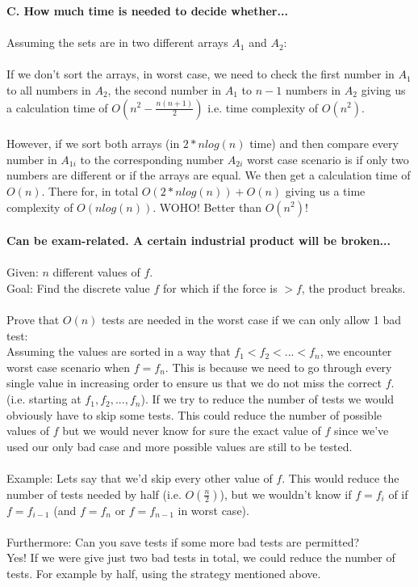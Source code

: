 \documentclass[12pt,oneside,reqno]{amsart}
\begin{document}
\textbf{C. How much time is needed to decide whether...}\\\\
Assuming the sets are in two different arrays $A_1$ and $A_2$:\\\\
If we don't sort the arrays, in worst case, we need to check the first number in $A_1$ to all numbers in $A_2$, the second number in $A_1$ to $n-1$ numbers in $A_2$ giving us a calculation time of $O(n^2-\frac{n(n+1)}{2})$ i.e. time complexity of $O(n^2)$.\\\\
However, if we sort both arrays (in $2*nlog(n)$ time) and then compare every number in $A_{1i}$ to the corresponding number $A_{2i}$ worst case scenario is if only two numbers are different or if the arrays are equal. We then get a calculation time of $O(n)$. There for, in total $O(2*nlog(n)) + O(n)$ giving us a time complexity of $O(nlog(n))$. WOHO! Better than $O(n^2)!$\\\\
\newpage
\textbf{Can be exam-related. A certain industrial product will be broken...}\\\\
Given: $n$ different values of $f$.\\
Goal: Find the discrete value $f$ for which if the force is $>f$, the product breaks.\\\\
Prove that $O(n)$ tests are needed in the worst case if we can only allow 1 bad test:\\
Assuming the values are sorted in a way that $f_1 < f_2 < ... < f_n$, we encounter worst case scenario when $f=f_n$. This is because we need to go through every single value in increasing order to ensure us that we do not miss the correct $f$. (i.e. starting at $f_1, f_2, ..., f_n$). If we try to reduce the number of tests we would obviously have to skip some tests. This could reduce the number of possible values of $f$ but we would never know for sure the exact value of $f$ since we've used our only bad case and more possible values are still to be tested.\\\\
Example: Lets say that we'd skip every other value of $f$. This would reduce the number of tests needed by half (i.e. $O(\frac{n}{2})$), but we wouldn't know if $f=f_i$ of if $f=f_{i-1}$ (and $f=f_n$ or $f=f_{n-1}$ in worst case).\\\\
Furthermore: Can you save tests if some more bad tests are permitted?\\
Yes! If we were give just two bad tests in total, we could reduce the number of tests. For example by half, using the strategy mentioned above.\\
\end{document}
